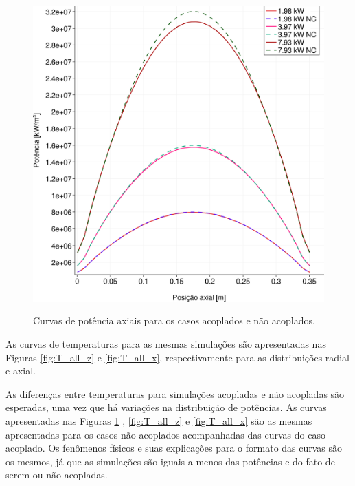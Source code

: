 \begin{figure}[htb]
  \caption{Curvas de potência axiais para os casos acoplados e não acoplados.}
  \centering\includegraphics[scale=0.5]{figuras/Q_all_z_square_port.png}
  \label{fig:Q_all_z}
\end{figure}


As curvas de temperaturas para as mesmas simulações são apresentadas nas
Figuras \ref{fig:T_all_z} e \ref{fig:T_all_x}, respectivamente para as
distribuições radial e axial.

As diferenças entre temperaturas para simulações acopladas e não acopladas são
esperadas, uma vez que há variações na distribuição  de potências. As curvas apresentadas nas Figuras
\ref{fig:Q_all_z}%
, \ref{fig:T_all_z} e \ref{fig:T_all_x} são
as mesmas apresentadas para os casos não acoplados acompanhadas das curvas do
caso acoplado. Os fenômenos físicos e suas explicações para o formato das curvas
são os mesmos, já que as simulações são iguais a menos das potências e do fato
de serem ou não acopladas.

